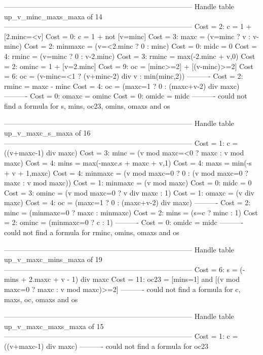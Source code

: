 --------------------------------------------------------------------------------
Handle table up_v_minc_maxs_maxa of 14
--------------------------------------------------------------------------------
Cost =  2:  c       = 1 + [2.minc=<v]
Cost =  0:  c       = 1 + not [v=minc]
Cost =  3:  maxc    = (v=minc ? v : v-minc)
Cost =  2:  minmaxc = (v=<2.minc ? 0 : minc)
Cost =  0:  midc    = 0
Cost =  4:  rminc   = (v=minc ? 0 : v-2.minc)
Cost =  3:  rminc   = max(-2.minc + v,0)
Cost =  2:  ominc   = 1 + [v=2.minc]
Cost =  9:  oc      = [minc>=2] + [(v-minc)>=2]
Cost =  6:  oc      = (v-minc=<1 ? (v+minc-2) div v : min(minc,2))
----------
Cost =  2:  rminc   = maxc - minc
Cost =  4:  oc      = (maxc=1 ? 0 : (maxc+v-2) div maxc)
----------
Cost =  0:  omaxc   = ominc
Cost =  0:  omidc   = midc
----------
could not find a formula for s, mins, oc23, omins, omaxs and os


--------------------------------------------------------------------------------
Handle table up_v_maxc_s_maxa of 16
--------------------------------------------------------------------------------
Cost =  1:  c       = ((v+maxc-1) div maxc)
Cost =  3:  minc    = (v mod maxc=<0 ? maxc : v mod maxc)
Cost =  4:  mins    = max(-maxc.s + maxc + v,1)
Cost =  4:  maxs    = min(-s + v + 1,maxc)
Cost =  4:  minmaxc = (v mod maxc=0 ? 0 : (v mod maxc=0 ? maxc : v mod maxc))
Cost =  1:  minmaxc = (v mod maxc)
Cost =  0:  midc    = 0
Cost =  3:  ominc   = (v mod maxc=0 ? v div maxc : 1)
Cost =  1:  omaxc   = (v div maxc)
Cost =  4:  oc      = (maxc=1 ? 0 : (maxc+v-2) div maxc)
----------
Cost =  2:  minc    = (minmaxc=0 ? maxc : minmaxc)
Cost =  2:  mins    = (s=c ? minc : 1)
Cost =  2:  ominc   = (minmaxc=0 ? c : 1)
----------
Cost =  0:  omidc   = midc
----------
could not find a formula for rminc, omins, omaxs and os


--------------------------------------------------------------------------------
Handle table up_v_maxc_mins_maxa of 19
--------------------------------------------------------------------------------
Cost =  6:  s     = (-mins + 2.maxc + v - 1) div maxc
Cost = 11:  oc23  = [mins=1] and [(v mod maxc=0 ? maxc : v mod maxc)>=2]
----------
could not find a formula for c, maxs, oc, omaxs and os


--------------------------------------------------------------------------------
Handle table up_v_maxc_maxs_maxa of 15
--------------------------------------------------------------------------------
Cost =  1:  c    = ((v+maxc-1) div maxc)
----------
could not find a formula for oc23


